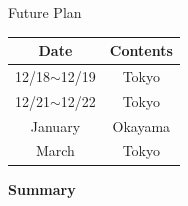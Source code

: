 \documentclass[dvipdfmx, unicode, 169]{beamer}
\begin{document}
\begin{frame}{Future Plan}
  \centering
  \begin{table}[]
    \begin{tabular}{c|c}
      Date             & Contents \\ \hline
      12/18$\sim$12/19 & Tokyo    \\
      12/21$\sim$12/22 & Tokyo    \\
      January          & Okayama  \\
      March            & Tokyo
    \end{tabular}
  \end{table}
\end{frame}

\begin{frame}[t]{\bfseries Summary}
  \tableofcontents
\end{frame}

\end{document}
